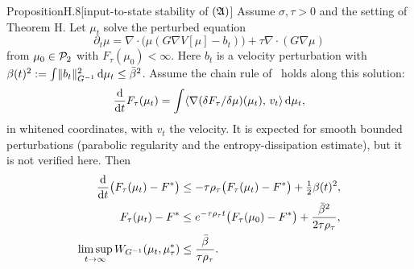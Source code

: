 \begin{thm}{Proposition}{H.8}[input-to-state stability of $(\mathfrak{A})$]
Assume $\sigma,\tau>0$ and the setting of Theorem H. Let $\mu_t$ solve the perturbed equation
\begin{equation}\label{eq:finitegain:perturbed}
  \partial_t\mu = \nabla\cdot\bigl(\mu(G\nabla V[\mu] - b_t)\bigr) + \tau\nabla\cdot(G\nabla\mu)
\end{equation}
from $\mu_0\in\mathcal{P}_2$ with $F_\tau(\mu_0)<\infty$. Here $b_t$ is a velocity perturbation with
$\beta(t)^2 := \int\lVert b_t\rVert^2_{G^{-1}}\,\mathrm{d}\mu_t\le\bar\beta^2$. Assume the chain rule of~\cite[Lemma~2.2]{S3}
holds along this solution:
\[
  \frac{\mathrm{d}}{\mathrm{d}t}F_\tau(\mu_t) = \int\langle \nabla(\delta F_\tau/\delta\mu)(\mu_t),\, v_t\rangle\,\mathrm{d}\mu_t,
\]
in whitened coordinates, with $v_t$ the velocity. It is expected for smooth bounded perturbations (parabolic regularity and the
entropy-dissipation estimate), but it is not verified here. Then
\begin{align}
  \frac{\mathrm{d}}{\mathrm{d}t}\bigl(F_\tau(\mu_t)-F^*\bigr)
    &\le -\tau\rho_\tau\bigl(F_\tau(\mu_t)-F^*\bigr) + \tfrac12\beta(t)^2,\label{eq:finitegain:iss1}\\
  F_\tau(\mu_t)-F^* &\le e^{-\tau\rho_\tau t}\bigl(F_\tau(\mu_0)-F^*\bigr) + \frac{\bar\beta^2}{2\tau\rho_\tau},
    \label{eq:finitegain:iss2}\\
  \limsup_{t\to\infty}W_{G^{-1}}(\mu_t,\mu^*_\tau) &\le \frac{\bar\beta}{\tau\rho_\tau}.\label{eq:finitegain:iss3}
\end{align}
\end{thm}

